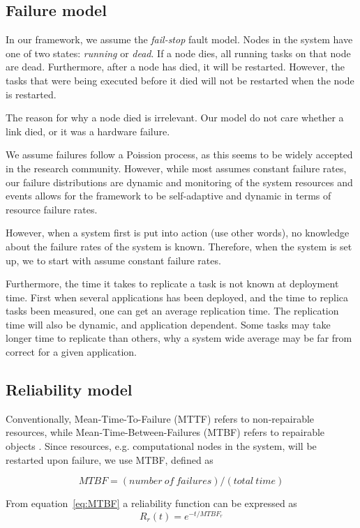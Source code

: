 \documentclass{cslthse-msc}
\begin{document}
\subsection{Failure model}
In our framework, we assume the \emph{fail-stop} fault model. Nodes in the system have one of two states: \emph{running} or \emph{dead}. If a node dies, all running tasks on that node are dead. Furthermore, after a node has died, it will be restarted. However, the tasks that were being executed before it died will not be restarted when the node is restarted.

The reason for why a node died is irrelevant. Our model do not care whether a link died, or it was a hardware failure. 

We assume failures follow a Poission process, as this seems to be widely accepted in the research community. However, while most assumes constant failure rates, our failure distributions are dynamic and monitoring of the system resources and events allows for the framework to be self-adaptive and dynamic in terms of resource failure rates.

However, when a system first is put into action (use other words), no knowledge about the failure rates of the system is known. Therefore, when the system is set up, we to start with assume constant failure rates.

Furthermore, the time it takes to replicate a task is not known at deployment time. First when several applications has been deployed, and the time to replica tasks been measured, one can get an average replication time. The replication time will also be dynamic, and application dependent. Some tasks may take longer time to replicate than others, why a system wide average may be far from correct for a given application.


\subsection{Reliability model}
Conventionally, Mean-Time-To-Failure (MTTF) refers to non-repairable resources, while Mean-Time-Between-Failures (MTBF) refers to repairable objects \cite{effTaskReplMobGrid}. Since resources, e.g. computational nodes in the system, will be restarted upon failure, we use MTBF, defined as

\begin{equation} \label{eq:MTBF}
MTBF = (number\ of\ failures) / (total\ time)
\end{equation}

From equation~\ref{eq:MTBF} a reliability function can be expressed as 
\begin{equation} \label{eq:resource_reliability}
R_{r}(t) = e^{-t/MTBF_{r}}
\end{equation}
\end{document}
